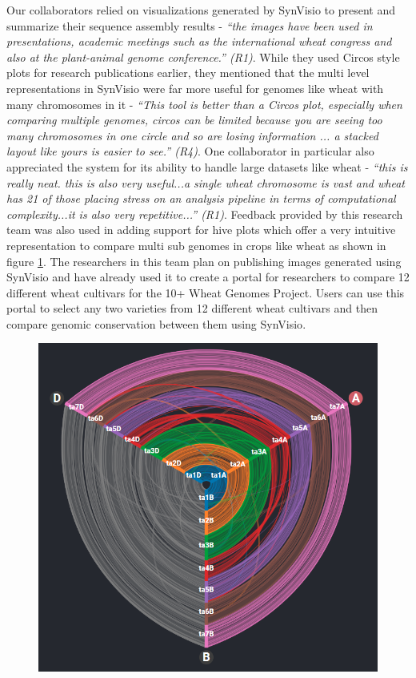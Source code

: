 Our collaborators relied on visualizations generated by SynVisio to present and summarize their sequence assembly results - \textit{``the images have been used in presentations, academic meetings such as the international wheat congress and also at the plant-animal genome conference.'' (R1)}. While they used Circos style plots for research publications earlier, they mentioned that the multi level representations in SynVisio were far more useful for genomes like wheat with many chromosomes in it - \textit{``This tool is better than a Circos plot, especially when comparing multiple genomes, circos can be limited because you are seeing too many chromosomes in one circle and so are losing information ... a stacked layout like yours is easier to see.'' (R4)}. One collaborator in particular also appreciated the system for its ability to handle large datasets like wheat - \textit{``this is really neat. this is also very useful...a single wheat chromosome is vast and wheat has 21 of those placing stress on an analysis pipeline in terms of computational complexity...it is also very repetitive...'' (R1)}.
Feedback provided by this research team was also used in adding support for hive plots which offer a very intuitive representation to compare multi sub genomes in crops like wheat as shown in figure \ref{fig:ch_6_wheat}. The researchers in this team plan on publishing images generated using SynVisio and have already used it to create a portal for researchers to compare 12 different wheat cultivars for the 10+ Wheat Genomes Project. Users can use this portal to select any two varieties from 12 different wheat cultivars and then compare genomic conservation between them using SynVisio\cite{10wheat,wheatinfogithub}.

\begin{figure}
  \centering
  \includegraphics[width=0.72\linewidth]{images/ch_6_wheat.PNG}
  \label{fig:ch_6_wheat}
\end{figure}


